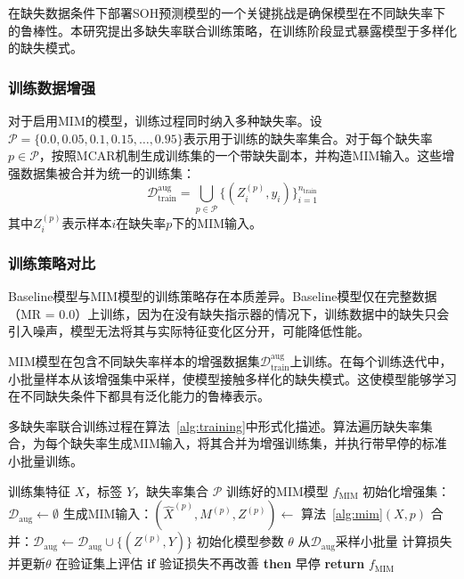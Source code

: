 \documentclass[10pt,a4paper]{ctexart}
\begin{document}
在缺失数据条件下部署SOH预测模型的一个关键挑战是确保模型在不同缺失率下的鲁棒性。本研究提出多缺失率联合训练策略，在训练阶段显式暴露模型于多样化的缺失模式。

\subsubsection{训练数据增强}

对于启用MIM的模型，训练过程同时纳入多种缺失率。设$\mathcal{P} = \{0.0, 0.05, 0.1, 0.15, \ldots, 0.95\}$表示用于训练的缺失率集合。对于每个缺失率$p \in \mathcal{P}$，按照MCAR机制生成训练集的一个带缺失副本，并构造MIM输入。这些增强数据集被合并为统一的训练集：
\begin{equation}
    \mathcal{D}_{\text{train}}^{\text{aug}} = \bigcup_{p \in \mathcal{P}} \{(Z^{(p)}_i, y_i)\}_{i=1}^{n_{\text{train}}}
\end{equation}
其中$Z^{(p)}_i$表示样本$i$在缺失率$p$下的MIM输入。

\subsubsection{训练策略对比}

Baseline模型与MIM模型的训练策略存在本质差异。Baseline模型仅在完整数据（MR = 0.0）上训练，因为在没有缺失指示器的情况下，训练数据中的缺失只会引入噪声，模型无法将其与实际特征变化区分开，可能降低性能。

MIM模型在包含不同缺失率样本的增强数据集$\mathcal{D}_{\text{train}}^{\text{aug}}$上训练。在每个训练迭代中，小批量样本从该增强集中采样，使模型接触多样化的缺失模式。这使模型能够学习在不同缺失条件下都具有泛化能力的鲁棒表示。

多缺失率联合训练过程在算法~\ref{alg:training}中形式化描述。算法遍历缺失率集合，为每个缺失率生成MIM输入，将其合并为增强训练集，并执行带早停的标准小批量训练。

\begin{algorithm}[!htbp]
\caption{多缺失率联合训练}
\label{alg:training}
\begin{algorithmic}[1]
\REQUIRE 训练集特征 $X$，标签 $Y$，缺失率集合 $\mathcal{P}$
\ENSURE 训练好的MIM模型 $f_{\text{MIM}}$
\STATE 初始化增强集：$\mathcal{D}_{\text{aug}} \leftarrow \emptyset$
    \STATE 生成MIM输入：$(\hat{X}^{(p)}, M^{(p)}, Z^{(p)}) \leftarrow$ 算法~\ref{alg:mim}$(X, p)$
    \STATE 合并：$\mathcal{D}_{\text{aug}} \leftarrow \mathcal{D}_{\text{aug}} \cup \{(Z^{(p)}, Y)\}$
\ENDFOR
\STATE 初始化模型参数 $\theta$
    \STATE 从$\mathcal{D}_{\text{aug}}$采样小批量
    \STATE 计算损失并更新$\theta$
    \STATE 在验证集上评估
    \STATE \textbf{if} 验证损失不再改善 \textbf{then} 早停
\ENDFOR
\STATE \textbf{return} $f_{\text{MIM}}$
\end{algorithmic}
\end{algorithm}
\end{document}
